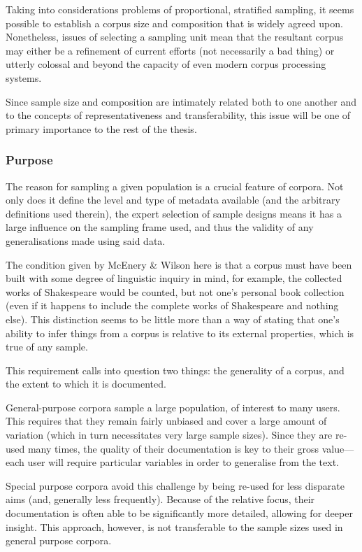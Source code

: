 Taking into considerations problems of proportional, stratified sampling, it seems possible to establish a corpus size and composition that is widely agreed upon.  Nonetheless, issues of selecting a sampling unit mean that the resultant corpus may either be a refinement of current efforts (not necessarily a bad thing) or utterly colossal and beyond the capacity of even modern corpus processing systems.

Since sample size and composition are intimately related both to one another and to the concepts of representativeness and transferability, this issue will be one of primary importance to the rest of the thesis.





\subsubsection{Purpose}
The reason for sampling a given population is a crucial feature of corpora.  Not only does it define the level and type of metadata available (and the arbitrary definitions used therein), the expert selection of sample designs means it has a large influence on the sampling frame used, and thus the validity of any generalisations made using said data.

The condition given by McEnery \& Wilson\cite{mcenery2001corpus} here is that a corpus must have been built with some degree of linguistic inquiry in mind, for example, the collected works of Shakespeare would be counted, but not one's personal book collection (even if it happens to include the complete works of Shakespeare and nothing else).  This distinction seems to be little more than a way of stating that one's ability to infer things from a corpus is relative to its external properties, which is true of any sample.

This requirement calls into question two things: the generality of a corpus, and the extent to which it is documented.

General-purpose corpora sample a large population, of interest to many users.  This requires that they remain fairly unbiased and cover a large amount of variation (which in turn necessitates very large sample sizes).  Since they are re-used many times, the quality of their documentation is key to their gross value---each user will require particular variables in order to generalise from the text.

Special purpose corpora avoid this challenge by being re-used for less disparate aims (and, generally less frequently).  Because of the relative focus, their documentation is often able to be significantly more detailed, allowing for deeper insight.  This approach, however, is not transferable to the sample sizes used in general purpose corpora.

